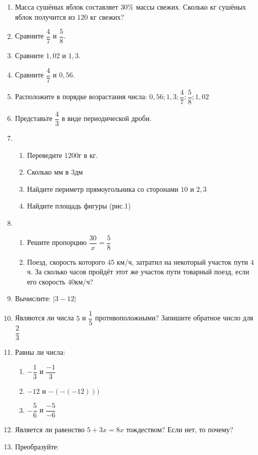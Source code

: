 \documentclass[12pt, a4paper]{article}
\begin{document}
\begin{enumerate}
		\item Масса сушёных яблок составляет $30\%$ массы свежих. Сколько кг сушёных яблок получится из $120$ кг свежих?
		\item Сравните $\dfrac{4}{7}$ и $\dfrac{5}{8}$.
		\item Сравните $1,02$ и $1,3$.
		\item Сравните $\dfrac{4}{7}$ и $0,56$.
		\item Расположите в порядке возрастания числа:	
		$0,56; 1,3; \dfrac{4}{7}; \dfrac{5}{8}; 1,02$
		\item Представьте $\dfrac{4}{3}$ в виде периодической дроби.
		\item 
		\begin{enumerate}[label=\asbuk*)]
			\item Переведите $1200$г в кг.
			\item Сколько мм в $3$дм
			\item Найдите периметр прямоугольника со сторонами $10$ и $2,3$
			\item Найдите площадь фигуры	(рис.1)
		\end{enumerate}	
		\item 
		 \begin{enumerate}[label=\asbuk*)]
			\item Решите пропорцию $\dfrac{30}{x}=\dfrac{5}{8}$
			\item Поезд, скорость которого $45$ км/ч, затратил на некоторый участок пути $4$ч. За сколько часов пройдёт этот же участок пути товарный поезд, если его скорость $40$км/ч?
		\end{enumerate}
		\item Вычислите:
		$|3-12|$
		\item Являются ли числа $5$ и $\dfrac{1}{5}$ противоположными? Запишите обратное число для $\dfrac{2}{3}$
		\item Равны ли числа:
		\begin{enumerate}[label=\asbuk*)]
			\item $-\dfrac{1}{3}$ и $\dfrac{-1}{3}$
			\item $-12$ и $-(-(-12)))$
			\item $-\dfrac{5}{6}$ и $\dfrac{-5}{-6}$
		\end{enumerate}
	\item Является ли равенство $5+3x=8x$ тождеством? Если нет, то почему?
	\item Преобразуйте:
	\begin{multicols}{2}
		\begin{enumerate}[label=\asbuk*)]

\end{enumerate}
\end{multicols}
\end{enumerate}
\end{document}
